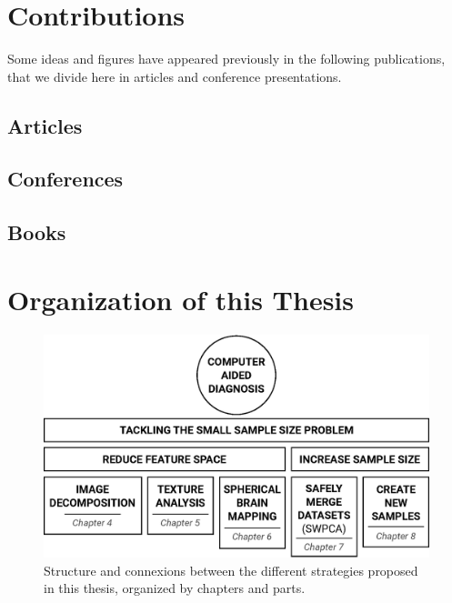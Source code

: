 \section{Contributions}
Some ideas and figures have appeared previously in the following publications, that we divide here in articles and conference presentations. 


\begin{refsection}[ownpubs]
	\small
	\nocite{*} %
	\newrefcontext[sorting=ydnt]
	\subsection{Articles}
	\printbibliography[env=nolabelbib,heading=none,keyword=own, title={Articles}, type=article]
	\subsection{Conferences}
	\printbibliography[env=nolabelbib,heading=none,keyword=own, title={Conferences}, type=inproceedings]
	\subsection{Books}
	\printbibliography[env=nolabelbib,heading=none,keyword=own, title={Books}, type=inbook]
\end{refsection}

\section{Organization of this Thesis}

\begin{figure}
\centering
\includegraphics[width=0.7\linewidth]{Graphics/ch1/outline}
\caption[Structure of the thesis.]{Structure and connexions between the different strategies proposed in this thesis, organized by chapters and parts.}
\label{fig:outline}
\end{figure}

